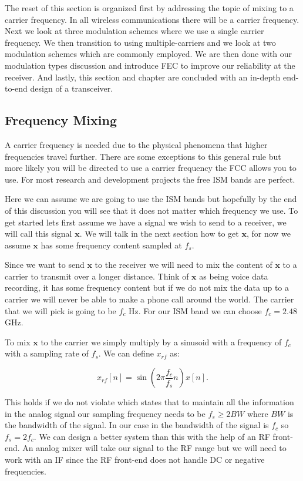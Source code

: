The reset of this section is organized first by addressing the topic of mixing to a carrier frequency. In all wireless communications there will be a carrier frequency. Next we look at three modulation schemes where we use a single carrier frequency. We then transition to using multiple-carriers and we look at two modulation schemes which are commonly employed. We are then done with our modulation types discussion and introduce \ac{FEC} to improve our reliability at the receiver. And lastly, this section and chapter are concluded with an in-depth end-to-end design of a transceiver.

\subsection{Frequency Mixing} 
\label{sec:cmix}	
A carrier frequency is needed due to the physical phenomena that higher frequencies travel further. There are some exceptions to this general rule but more likely you will be directed to use a carrier frequency the \ac{FCC} allows you to use. For most research and development projects the free \ac{ISM} bands are perfect.

Here we can assume we are going to use the \ac{ISM} bands but hopefully by the end of this discussion you will see that it does not matter which frequency we use. To get started lets first assume we have a signal we wish to send to a receiver, we will call this signal $\mathbf{x}$. We will talk in the next section how to get $\mathbf{x}$, for now we assume $\mathbf{x}$ has some frequency content sampled at $f_s$.

Since we want to send $\mathbf{x}$ to the receiver we will need to mix the content of $\mathbf{x}$ to a carrier to transmit over a longer distance. Think of $\mathbf{x}$ as being voice data recording, it has some frequency content but if we do not mix the data up to a carrier we will never be able to make a phone call around the world. The carrier that we will pick is going to be $f_c$ \ac{Hz}. For our \ac{ISM} band we can choose $f_c = 2.48$ \ac{GHz}.

To mix $\mathbf{x}$ to the carrier we simply multiply by a sinusoid with a frequency of $f_c$ with a sampling rate of $f_s$. We can define $x_{rf}$ as:

\begin{equation}
\label{eq:mix}
x_{rf}[n] = \sin\left(2\pi\frac{f_c}{f_s}n\right)x[n].
\end{equation}	

This holds if we do not violate  which states that to maintain all the information in the analog signal our sampling frequency needs to be $f_s \geq 2BW$ where $BW$ is the bandwidth of the signal. In our case in  the bandwidth of the signal is $f_c$ so $f_s = 2f_c$. We can design a better system than this with the help of an \ac{RF} front-end. An analog mixer will take our signal to the \ac{RF} range but we will need to work with an \ac{IF} since the \ac{RF} front-end does not handle \ac{DC} or negative frequencies.

